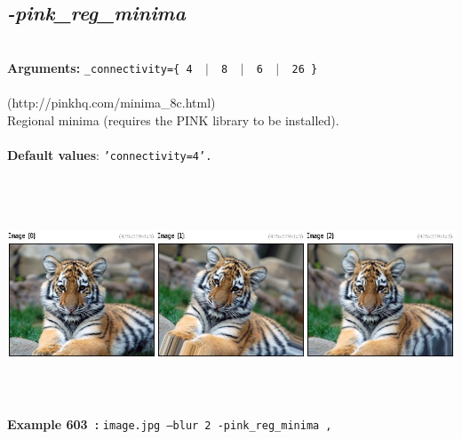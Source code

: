 \documentclass[a4paper,11pt,twoside]{book}
\begin{document}
\subsection{\emph{-pink\_reg\_minima} }\vspace*{-0.5em}
~\\\textbf{Arguments: } 
{\small \texttt{\_connectivity=\{ 4 ~$|$~ 8 ~$|$~ 6 ~$|$~ 26 \}}}\\~\\
(http://pinkhq.com/minima\_8c.html)
~\\Regional minima (requires the PINK library to be installed).
~\\~\\\textbf{Default values}: {\small \texttt{'connectivity=4'.}}
\begin{center}\includegraphics[keepaspectratio=true,height=7cm,width=\textwidth]{img/gmic_def603.jpg}\\
{\footnotesize \textbf{Example 603~:} \texttt{image.jpg --blur 2 -pink\_reg\_minima ,}}
\end{center}
\end{document}
